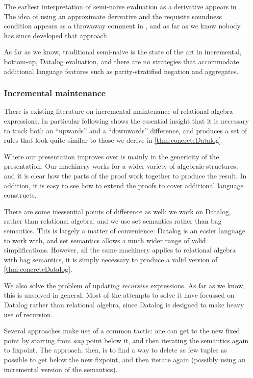 The earliest interpretation of semi-naive evaluation as a derivative 
appears in \textcite{bancilhon1986naive}. The idea of using an approximate derivative
and the requisite soundness condition appears as a throwaway comment in
\textcite[][section 3.2.2]{bancilhon1986amateur}, and as far as we know nobody has since
developed that approach.

As far as we know, traditional semi-naive is the state of
the art in incremental, bottom-up, Datalog evaluation, and there are no strategies that
accommodate additional language features such as parity-stratified negation and aggregates.

\subsubsection{Incremental maintenance}

There is existing literature on incremental maintenance of relational algebra
expressions. In particular \textcite{griffin1997improved} following
\textcite{qian1991incremental} shows the essential insight that it is necessary to
track both an ``upwards'' and a ``downwards'' difference, and produces a set of
rules that look quite similar to those we derive in \cref{thm:concreteDatalog}.

Where our presentation improves over \citeauthor{griffin1997improved} is mainly in
the genericity of the presentation. Our machinery works for a wider variety of
algebraic structures, and it is clear how the parts of the proof work together
to produce the result. In addition, it is easy to see how to extend the proofs
to cover additional language constructs.

There are some inessential points of difference as well: we work on Datalog,
rather than relational algebra; and we use set semantics rather than bag
semantics. This is largely a matter of convenience: Datalog is an easier
language to work with, and set semantics allows a much wider range of valid
simplifications. However, all the same machinery applies to relational algebra
with bag semantics, it is simply necessary to produce a valid version of \cref{thm:concreteDatalog}.

We also solve the problem of updating \emph{recursive} expressions. As far as we
know, this is unsolved in general. Most of the attempts to solve it have
focussed on Datalog rather than relational algebra, since Datalog is designed to
make heavy use of recursion.

Several approaches
\autocites{gupta1993maintaining}{harrison1992maintenance}
make use of a common tactic: one can get to the new fixed
point by starting from \emph{any} point below it, and then iterating the
semantics again to fixpoint. The approach, then, is to find a way to delete as
few tuples as possible to get below the new fixpoint, and then iterate again
(possibly using an incremental version of the semantics).

